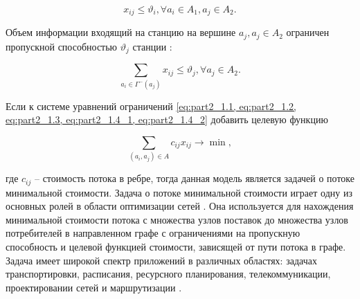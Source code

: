 
\begin{equation}\label{eq:part2_1.4_1}
    x_{ij} \leqslant \vartheta_i, \forall a_i \in A_1, a_j \in A_2.
\end{equation}



Объем информации входящий на станцию на вершине $a_j, a_j \in A_2$ ограничен пропускной способностью $\vartheta_j$ станции : 


\begin{equation}\label{eq:part2_1.4_2}
    \sum_{a_i \in \Gamma^-(a_j)} x_{ij} \leqslant \vartheta_j, \forall a_j \in A_2.
\end{equation}


Если к системе уравнений ограничений \cref{eq:part2_1.1, eq:part2_1.2, eq:part2_1.3, eq:part2_1.4_1, eq:part2_1.4_2} добавить целевую функцию

\begin{equation}
    \label{eq:part2_1.5}
    \sum_{(a_i, a_j) \in A} c_{ij} x_{ij} \rightarrow \min ,
\end{equation}

где $c_{ij}$ -- стоимость потока в ребре, тогда данная модель является задачей о потоке минимальной стоимости. Задача о потоке минимальной стоимости играет одну из основных ролей в области оптимизации сетей \cite{Kovacs2015}. Она используется для нахождения минимальной стоимости потока с множества узлов поставок до множества узлов потребителей в направленном графе с ограничениями на пропускную способность и целевой функцией стоимости, зависящей от пути потока в графе. Задача имеет широкой спектр приложений в различных областях: задачах транспортировки, расписания, ресурсного планирования, телекоммуникации, проектировании сетей и маршрутизации \cite{Kovacs2015, Kiraly2012, Jiang2020}.  


